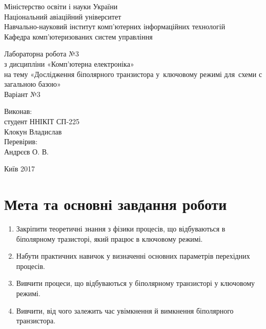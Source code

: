 \documentclass[a4paper,oneside,DIV=10,12pt]{scrartcl}
\begin{document}
	\begin{titlepage}
	\begin{center}
		Міністерство освіти і науки України\\
		Національний авіаційний університет\\
		Навчально-науковий інститут комп'ютерних інформаційних технологій\\
		Кафедра комп'ютеризованих систем управління

		\vspace{\fill}
		Лабораторна робота №3\\
		з дисципліни «Комп'ютерна електроніка»\\
		на тему «Дослідження біполярного транзистора у~ключовому режимі для~схеми с загальною базою»\\
		Варіант №3
		
		\vspace{\fill}
		\begin{flushright}
		Виконав:\\
		студент ННІКІТ СП-225\\
		Клокун Владислав\\
		Перевірив:\\
		Андрєєв О. В.
		\end{flushright}
		
		Київ 2017
	\end{center}
	\end{titlepage}
	
	\section{Мета та основні завдання роботи}
		\begin{enumerate}
			\item Закріпити теоретичні знання з фізики процесів, що відбуваються в біполярному тразисторі, який працює в ключовому режимі.
			\item Набути практичних навичок у визначенні основних параметрів перехідних процесів.
			\item Вивчити процеси,  що відбуваються у біполярному транзисторі у ключовому режимі.
			\item Вивчити, від чого залежить час увімкнення й вимкнення біполярного транзистора.
		\end{enumerate}
	
\end{document}
